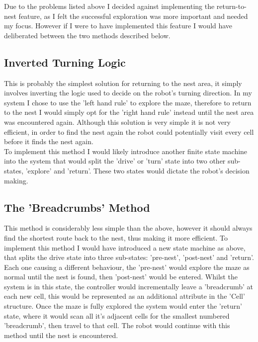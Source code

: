 \documentclass[a4paper]{article}
\begin{document}
	Due to the problems listed above I decided against implementing the return-to-nest feature, as I felt the successful exploration was more important and needed my focus. However if I were to have implemented this feature I would have deliberated between the two methods described below.
	
	\subsection{Inverted Turning Logic}
	This is probably the simplest solution for returning to the nest area, it simply involves inverting the logic used to decide on the robot's turning direction. In my system I chose to use the 'left hand rule' to explore the maze, therefore to return to the nest I would simply opt for the 'right hand rule' instead until the nest area was encountered again. Although this solution is very simple it is not very efficient, in order to find the nest again the robot could potentially visit every cell before it finds the nest again.\\
	
	To implement this method I would likely introduce another finite state machine into the system that would split the 'drive' or 'turn' state into two other sub-states, 'explore' and 'return'. These two states would dictate the robot's decision making.
	
	\subsection{The 'Breadcrumbs' Method}
	This method is considerably less simple than the above, however it should always find the shortest route back to the nest, thus making it more efficient. To implement this method I would have introduced a new state machine as above, that splits the drive state into three sub-states: 'pre-nest', 'post-nest' and 'return'. Each one causing a different behaviour, the 'pre-nest' would explore the maze as normal until the nest is found, then 'post-nest' would be entered. Whilst the system is in this state, the controller would incrementally leave a 'breadcrumb' at each new cell, this would be represented as an additional attribute in the 'Cell' structure. Once the maze is fully explored the system would enter the 'return' state, where it would scan all it's adjacent cells for the smallest numbered 'breadcrumb', then travel to that cell. The robot would continue with this method until the nest is encountered.
	
\end{document}

